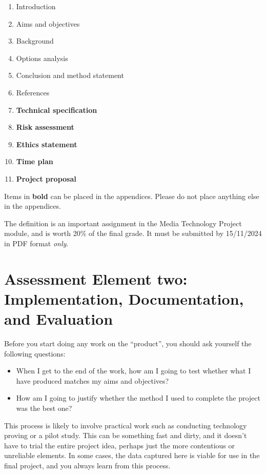 \begin{enumerate}
    \item Introduction
    \item Aims and objectives
    \item Background
    \item Options analysis
    \item Conclusion and method statement
    \item References
    \item \textbf{Technical specification}
    \item \textbf{Risk assessment}
    \item \textbf{Ethics statement}
    \item \textbf{Time plan}
    \item \textbf{Project proposal}
\end{enumerate}

Items in \textbf{bold} can be placed in the appendices. Please do not place anything else in the appendices. 

\begin{tcolorbox}
    The definition is an important assignment in the Media Technology Project module, and is worth 20\% of the final grade. It must be submitted by 15/11/2024 in PDF format \textit{only}. 
\end{tcolorbox}

\section{Assessment Element two: Implementation, Documentation, and Evaluation}

Before you start doing any work on the “product”, you should ask yourself the following questions:

\begin{itemize}
    \item When I get to the end of the work, how am I going to test whether what I have produced matches my aims and objectives?
    \item How am I going to justify whether the method I used to complete the project was the best one? 
\end{itemize}

This process is likely to involve practical work such as conducting technology proving or a pilot study. This can be something fast and dirty, and it doesn't have to trial the entire project idea, perhaps just the more contentious or unreliable elements. In some cases, the data captured here is viable for use in the final project, and you always learn from this process. 

